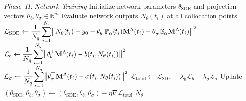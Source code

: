 \documentclass[11pt, a4paper]{article}
\theoremstyle{theoremstyle}
\theoremstyle{definitionstyle}
\DeclarePairedDelimiter{\norm}{\lVert}{\rVert}
\begin{document}
\begin{appendices}
\begin{algorithm}[H]
\begin{algorithmic}[1]
    \Statex \textit{Phase~II: Network Training}
    \State Initialize network parameters $\theta_{\text{SDE}}$ and projection vectors $\theta_b, \theta_\sigma \in \mathbb{R}^{\hat{m}}$
        \State Evaluate network outputs $N_\theta(t_i)$ at all collocation points
        \State $\displaystyle \mathcal{L}_{\text{SDE}} \gets \frac{1}{N_q} \sum_{i=1}^{N_q} \norm*{ N_\theta(t_i) - y_0 - \theta_b^\top \mathbb{P}_\alpha(t_i) \mathbf{M}^\Lambda(t_i) - \theta_\sigma^\top \mathbb{S}_\alpha \mathbf{M}^\Lambda(t_i) }^2$
        \State $\displaystyle \mathcal{L}_{b} \gets \frac{1}{N_q} \sum_{i=1}^{N_q} \norm*{ \theta_b^\top \mathbf{M}^\Lambda(t_i) - b(t_i, N_\theta(t_i)) }^2$
        \State $\displaystyle \mathcal{L}_{\sigma} \gets \frac{1}{N_q} \sum_{i=1}^{N_q} \norm*{ \theta_\sigma^\top \mathbf{M}^\Lambda(t_i) - \sigma(t_i, N_\theta(t_i)) }^2$
        \State $\mathcal{L}_{\text{total}} \gets \mathcal{L}_{\text{SDE}} + \lambda_b \mathcal{L}_b + \lambda_\sigma \mathcal{L}_\sigma$
        \State Update $(\theta_{\text{SDE}}, \theta_b, \theta_\sigma) \gets (\theta_{\text{SDE}}, \theta_b, \theta_\sigma) - \eta \nabla \mathcal{L}_{\text{total}}$
    \EndFor
    \State \Return $N_\theta$
    \end{algorithmic}
    \end{algorithm}
\end{appendices}
\end{document}
